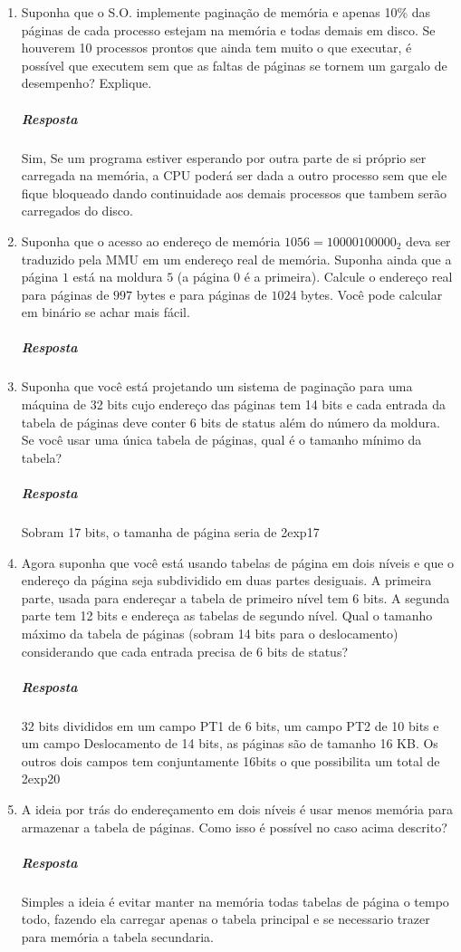 \documentclass[12pt]{article}
\begin{document}
\begin{enumerate}
\item
Suponha que o S.O. implemente paginação de memória e apenas 10\% das
páginas de cada processo estejam na memória e todas demais em
disco. Se houverem 10 processos prontos que ainda tem muito o que
executar, é possível que executem sem que as faltas de páginas se
tornem um gargalo de desempenho? Explique.
\subparagraph{Resposta}

Sim, Se um programa estiver esperando por outra parte de si próprio ser carregada na memória, a CPU poderá ser dada a outro processo sem que ele fique bloqueado dando continuidade aos demais processos que tambem serão carregados do disco.

\item
Suponha que o acesso ao endereço de memória $1056 = 10000100000_2$
deva ser traduzido pela MMU em um endereço real de memória. Suponha
ainda que a página $1$ está na moldura $5$ (a página $0$ é a
primeira). Calcule o endereço real para páginas de $997$ bytes e para
páginas de $1024$ bytes. Você pode calcular em binário se achar mais
fácil.
\subparagraph{Resposta}





\item
Suponha que você está projetando um sistema de paginação para uma
máquina de 32 bits cujo endereço das páginas tem 14 bits e cada
entrada da tabela de páginas deve conter 6 bits de status além do
número da moldura. Se você usar uma única tabela de páginas, qual é o
tamanho mínimo da tabela?
\subparagraph{Resposta}
Sobram 17 bits, o tamanha de página seria de 2exp17

\item
Agora suponha que você está usando tabelas de página em dois níveis e
que o endereço da página seja subdividido em duas partes desiguais. A
primeira parte, usada para endereçar a tabela de primeiro nível tem 6
bits. A segunda parte tem 12 bits e endereça as tabelas de segundo
nível. Qual o tamanho máximo da tabela de páginas (sobram 14 bits para
o deslocamento) considerando que cada entrada precisa de 6 bits de
status?
\subparagraph{Resposta}
32  bits divididos em um campo PT1 de 6 bits, um campo PT2 de 10 bits e um campo Deslocamento de 14 bits, as páginas são de tamanho 16 KB. Os outros dois campos tem conjuntamente 16bits o que possibilita um total de 2exp20
\item
A ideia por trás do endereçamento em dois níveis é usar menos memória
para armazenar a tabela de páginas. Como isso é possível no caso acima
descrito?
\subparagraph{Resposta}
 Simples a ideia é evitar manter na memória todas tabelas de página o tempo todo, fazendo ela carregar apenas o tabela principal e se necessario trazer para memória a tabela secundaria.


\end{enumerate}
\end{document}
